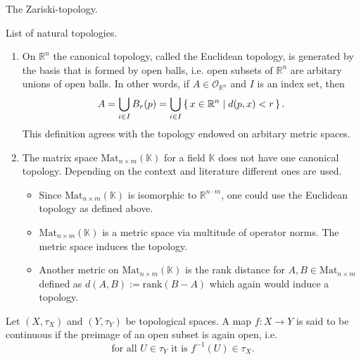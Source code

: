 \begin{exmbox}
    \begin{example}
        The Zariski-topology.
    \end{example}
\end{exmbox}
%
\begin{exmbox}
    \begin{example}
        List of natural topologies.
        \begin{enumerate}
            \item On \(\mathbb{R}^n\) the canonical topology, called the Euclidean topology, is generated by the basis that is formed by open balls, i.e. open subsets of \(\mathbb{R}^n\) are arbitary unions of open balls. In other words, if \(A \in \mathcal{O}_{\mathbb{R}^n}\) and \(I\) is an index set, then
            \begin{equation*}
                A = \bigcup_{i \in I} B_r(p) = \bigcup_{i \in I} \left\{\, x \in \mathbb{R}^n \mid d(p, x) < r \,\right\} \text{.}
            \end{equation*}
            This definition agrees with the topology endowed on arbitary metric spaces.
            \item The matrix space \(\mathrm{Mat}_{n \times m}(\mathbb{K})\) for a field \(\mathbb{K}\) does not have one canonical topology. Depending on the context and literature different ones are used.
            \begin{itemize}
                \item Since \(\mathrm{Mat}_{n \times m}(\mathbb{K})\) is isomorphic to \(\mathbb{R}^{n \cdot m}\), one could use the Euclidean topology as defined above.
                \item \(\mathrm{Mat}_{n \times m}(\mathbb{K})\) is a metric space via multitude of operator norms. The metric space induces the topology.
                \item Another metric on \(\mathrm{Mat}_{n \times m}(\mathbb{K})\) is the rank distance for \(A, B \in \mathrm{Mat}_{n \times m}\) defined as \(d(A, B) := \mathrm{rank}(B - A)\) which again would induce a topology.
            \end{itemize}
        \end{enumerate}
    \end{example}
\end{exmbox}
%
\begin{defbox}
    \begin{definition}
        Let \((X, \tau_X)\) and \((Y, \tau_Y)\) be {\color{mathif}topological spaces}. A {\color{mathif}map} \(f: X \longrightarrow Y\) is said to be {\color{maththen}continuous} if the preimage of an open subset is again open, i.e.
        \begin{equation}
            \text{for all } U \in \tau_Y \text{ it is } f^{-1}(U) \in \tau_X \text{.}
        \end{equation}
    \end{definition}
\end{defbox}

